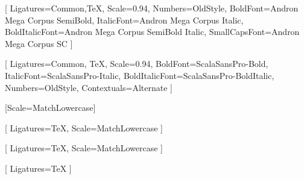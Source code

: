 %



\setmainfont{Andron Mega Corpus}[
    Ligatures={Common,TeX},
    Scale=0.94, %
    Numbers={OldStyle},
    BoldFont=Andron Mega Corpus SemiBold,
    ItalicFont=Andron Mega Corpus Italic,
    BoldItalicFont=Andron Mega Corpus SemiBold Italic,
    SmallCapsFont=Andron Mega Corpus SC
]

\setsansfont{ScalaSansPro-Regular}[
    Ligatures={Common, TeX},
    Scale=0.94,
    BoldFont=ScalaSansPro-Bold,
    ItalicFont=ScalaSansPro-Italic,
    BoldItalicFont=ScalaSansPro-BoldItalic,
    Numbers={OldStyle},
    Contextuals={Alternate}
]

\setmonofont{Iosevka}[Scale=MatchLowercase]

[
    Ligatures=TeX,
    Scale=MatchLowercase
]

\setmathfontface{}[
    Ligatures=TeX,
    Scale=MatchLowercase
]

\setoperatorfont\mathoper

\newfontface{}[
    Ligatures=TeX
]

